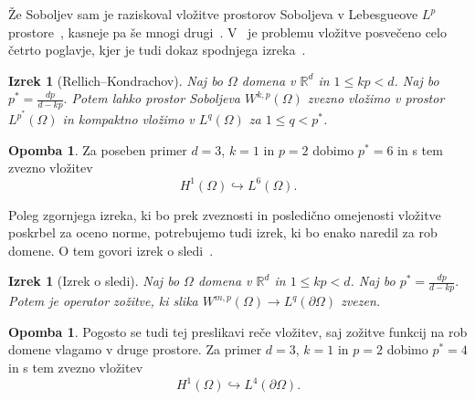 \documentclass[12pt,a4paper,twoside]{article}
\theoremstyle{definition} %
\newtheorem{opomba}[definicija]{Opomba}
\theoremstyle{plain} %
\newtheorem{izrek}[definicija]{Izrek}
\numberwithin{equation}{section}
\newcommand{\R}{\mathbb R}
\begin{document}
Že Soboljev sam je raziskoval vložitve prostorov Soboljeva v Lebesgueove $L^p$
prostore~\cite{soboleff1938theoreme}, kasneje pa še mnogi
drugi~\cite{brezis1980note,edmunds2000sobolev,evans1987sobolev}. V~\cite{adams2003sobolev} je
problemu vložitve posvečeno celo četrto poglavje, kjer je tudi dokaz spodnjega izreka~\cite[str.\
85, izrek 4.12]{adams2003sobolev}.
\begin{izrek}[Rellich--Kondrachov]
  \label{izr:vlozitev-sobolj}
  Naj bo $\Omega$ domena v $\R^d$ in $1 \leq kp < d$.  Naj bo $p^\ast = \frac{dp}{d-kp}.$ Potem lahko
  prostor Soboljeva $W^{k,p}(\Omega)$ zvezno vložimo v prostor $L^{p^\ast}(\Omega)$ in kompaktno
  vložimo v $L^q(\Omega)$ za $1 \leq q < p^\ast$.
\end{izrek}
\begin{opomba}
  Za poseben primer $d=3$, $k=1$ in $p=2$ dobimo $p^\ast = 6$ in s tem zvezno vložitev
  \begin{equation}
    \label{eq:vloz-int}
    H^1(\Omega) \hookrightarrow L^6(\Omega).
  \end{equation}
\end{opomba}
Poleg zgornjega izreka, ki bo prek zveznosti in posledično omejenosti vložitve poskrbel za oceno
norme, potrebujemo tudi izrek, ki bo enako naredil za rob domene. O tem govori izrek o
sledi~\cite[str.\ 164, izrek 5.36]{adams2003sobolev}.
\begin{izrek}[Izrek o sledi]
  \label{izr:soboljev-sled}
  Naj bo $\Omega$ domena v $\R^d$ in $1 \leq kp < d$. Naj bo $p^\ast = \frac{dp}{d-kp}.$  Potem
  je operator zožitve, ki slika $W^{m,p}(\Omega) \to L^q(\partial \Omega)$ zvezen.
\end{izrek}
\begin{opomba}
  Pogosto se tudi tej preslikavi reče vložitev, saj zožitve funkcij na rob domene vlagamo v druge
  prostore. Za primer $d=3$, $k=1$ in $p=2$ dobimo $p^\ast = 4$ in s tem zvezno vložitev
  \begin{equation}
    \label{eq:vloz-rob}
    H^1(\Omega) \hookrightarrow L^4(\partial\Omega).
  \end{equation}
\end{opomba}
\end{document}

